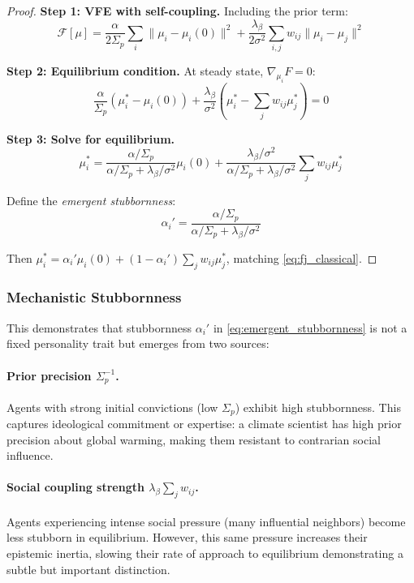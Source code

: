 \documentclass[12pt]{article}
\begin{document}
\begin{proof}
\textbf{Step 1: VFE with self-coupling.}
Including the prior term:
\begin{equation}
\mathcal{F}[\mu] = \frac{\alpha}{2\Sigma_p} \sum_i \|\mu_i - \mu_i(0)\|^2 + \frac{\lambda_\beta}{2\sigma^2} \sum_{i,j} w_{ij} \|\mu_i - \mu_j\|^2
\end{equation}

\textbf{Step 2: Equilibrium condition.}
At steady state, $\nabla_{\mu_i} F = 0$:
\begin{equation}
\frac{\alpha}{\Sigma_p}(\mu_i^* - \mu_i(0)) + \frac{\lambda_\beta}{\sigma^2}\left(\mu_i^* - \sum_j w_{ij}\mu_j^*\right) = 0
\end{equation}

\textbf{Step 3: Solve for equilibrium.}
\begin{equation}
\mu_i^* = \frac{\alpha/\Sigma_p}{\alpha/\Sigma_p + \lambda_\beta/\sigma^2}\mu_i(0) + \frac{\lambda_\beta/\sigma^2}{\alpha/\Sigma_p + \lambda_\beta/\sigma^2}\sum_j w_{ij}\mu_j^*
\end{equation}

Define the \emph{emergent stubbornness}:
\begin{equation}
\alpha_i' = \frac{\alpha/\Sigma_p}{\alpha/\Sigma_p + \lambda_\beta/\sigma^2}
\label{eq:emergent_stubbornness}
\end{equation}

Then $\mu_i^* = \alpha_i' \mu_i(0) + (1-\alpha_i')\sum_j w_{ij}\mu_j^*$, matching \eqref{eq:fj_classical}.
\end{proof}

\subsubsection{Mechanistic Stubbornness}

This demonstrates that stubbornness $\alpha_i'$ in \eqref{eq:emergent_stubbornness} is not a fixed personality trait but emerges from two sources:

\paragraph{Prior precision $\Sigma_p^{-1}$.} Agents with strong initial convictions (low $\Sigma_p$) exhibit high stubbornness. This captures ideological commitment or expertise: a climate scientist has high prior precision about global warming, making them resistant to contrarian social influence.

\paragraph{Social coupling strength $\lambda_\beta \sum_j w_{ij}$.} Agents experiencing intense social pressure (many influential neighbors) become less stubborn in equilibrium. However, this same pressure increases their epistemic inertia, slowing their rate of approach to equilibrium demonstrating a subtle but important distinction.
\end{document}

